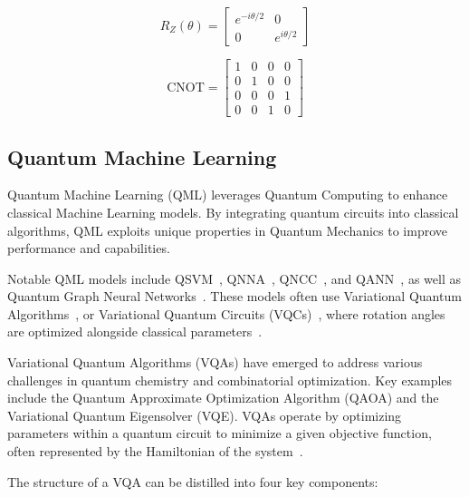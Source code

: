 \documentclass[12pt,a4paper]{report}
\begin{document}
\[
  R_Z(\theta) = \begin{bmatrix}
    e^{-i\theta/2} & 0             \\
    0              & e^{i\theta/2}
  \end{bmatrix}
\]

\[
  \text{CNOT} = \begin{bmatrix}
    1 & 0 & 0 & 0 \\
    0 & 1 & 0 & 0 \\
    0 & 0 & 0 & 1 \\
    0 & 0 & 1 & 0
  \end{bmatrix}
\]

\subsection{Quantum Machine Learning}
Quantum Machine Learning (QML) leverages Quantum Computing to enhance classical Machine Learning models. By integrating quantum circuits into classical algorithms, QML exploits unique properties in Quantum Mechanics to improve performance and capabilities.

Notable QML models include QSVM~\cite{rebentrost2014quantum}, QNNA~\cite{wiebe2015quantum}, QNCC~\cite{johri2021nearest}, and QANN~\cite{narayanan2000quantum}, as well as Quantum Graph Neural Networks~\cite{hu2021forcenet}. These models often use Variational Quantum Algorithms~\cite{cerezo2021variational}, or Variational Quantum Circuits (VQCs)~\cite{benedetti2019parameterized}, where rotation angles are optimized alongside classical parameters~\cite{Comajoan_Cara_2024}.

Variational Quantum Algorithms (VQAs) have emerged to address various challenges in quantum chemistry and combinatorial optimization. Key examples include the Quantum Approximate Optimization Algorithm (QAOA) and the Variational Quantum Eigensolver (VQE). VQAs operate by optimizing parameters within a quantum circuit to minimize a given objective function, often represented by the Hamiltonian of the system~\cite{wang2024comprehensive}.

The structure of a VQA can be distilled into four key components:
\end{document}

